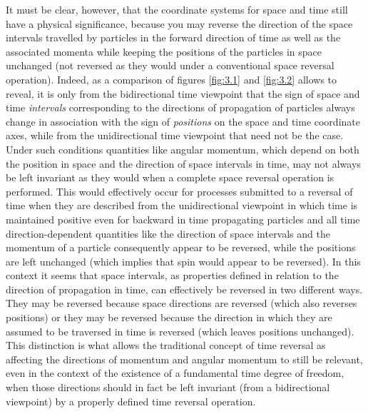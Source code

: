 \documentclass[notitlepage,12pt]{report}
\begin{document}
It must be clear, however, that the coordinate systems for space and time still have a physical significance, because you may reverse the direction of the space intervals travelled by particles in the forward direction of time as well as the associated momenta while keeping the positions of the particles in space unchanged (not reversed as they would under a conventional space reversal operation). Indeed, as a comparison of figures \ref{fig:3.1} and \ref{fig:3.2} allows to reveal, it is only from the bidirectional time viewpoint that the sign of space and time \textit{intervals} corresponding to the directions of propagation of particles always change in association with the sign of \textit{positions} on the space and time coordinate axes, while from the unidirectional time viewpoint that need not be the case. Under such conditions quantities like angular momentum, which depend on both the position in space and the direction of space intervals in time, may not always be left invariant as they would when a complete space reversal operation is performed. This would effectively occur for processes submitted to a reversal of time when they are described from the unidirectional viewpoint in which time is maintained positive even for backward in time propagating particles and all time direction-dependent quantities like the direction of space intervals and the momentum of a particle consequently appear to be reversed, while the positions are left unchanged (which implies that spin would appear to be reversed). In this context it seems that space intervals, as properties defined in relation to the direction of propagation in time, can effectively be reversed in two different ways. They may be reversed because space directions are reversed (which also reverses positions) or they may be reversed because the direction in which they are assumed to be traversed in time is reversed (which leaves positions unchanged). This distinction is what allows the traditional concept of time reversal as affecting the directions of momentum and angular momentum to still be relevant, even in the context of the existence of a fundamental time degree of freedom, when those directions should in fact be left invariant (from a bidirectional viewpoint) by a properly defined time reversal operation.
\end{document}
